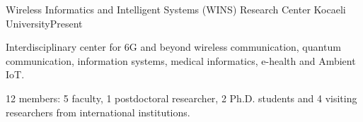 
\begin{cventries}
    {Wireless Informatics and Intelligent Systems (WINS) Research Center}
    {Kocaeli University}{Present}
    {\begin{cvitems}
       \item Interdisciplinary center for 6G and beyond wireless communication, quantum communication, information systems, medical informatics, e-health and Ambient IoT.
       \item 12 members: 5 faculty, 1 postdoctoral researcher, 2 Ph.D. students and 4 visiting researchers from international institutions.
     \end{cvitems}}
\end{cventries}

\begin{cvskills}
\end{cvskills}

